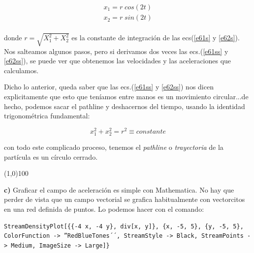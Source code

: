\documentclass[10pt,a4paper]{article}
\theoremstyle{definition}
\begin{document}
\begin{eqnarray}
\label{e61ss}x_1 = r\; cos(2t) \\
\label{e62ss}x_2 = r\; sin(2t) \\
\end{eqnarray}

\noindent donde $r = \sqrt{X_1^2 + X_2^2}$ es la constante de integración de las ecs(\ref{e61s} y \ref{e62s}). Nos salteamos algunos pasos, pero si derivamos dos veces las ecs.(\ref{e61ss} y \ref{e62ss}), se puede ver que obtenemos las velocidades y las aceleraciones que calculamos. 

Dicho lo anterior, queda saber que las ecs.(\ref{e61ss} y \ref{e62ss}) nos dicen explicitamente que esto que teníamos entre manos es un movimiento circular...de hecho, podemos sacar el pathline y deshacernos del tiempo, usando la identidad trigonométrica fundamental:

\begin{equation}
x_1^2 + x_2^2 = r^2 \equiv constante \label{e63sol}
\end{equation}

\noindent con todo este complicado proceso, tenemos el \textit{pathline} o \textit{trayectoria} de la partícula es un círculo cerrado.

\line(1,0){100}

\textbf{c)} Graficar el campo de aceleración es simple con Mathematica. No hay que perder de vista que un campo vectorial se grafica habitualmente con vectorcitos en una red definida de puntos. Lo podemos hacer con el comando:

\noindent \texttt{StreamDensityPlot[\{\{-4 x, -4 y\}, div[x, y]\}, \{x, -5, 5\}, \{y, -5, 5\}, \linebreak
 ColorFunction -> ''RedBlueTones´´, StreamStyle -> Black,  \linebreak
 StreamPoints -> Medium, ImageSize -> Large]\}}
\end{document}
